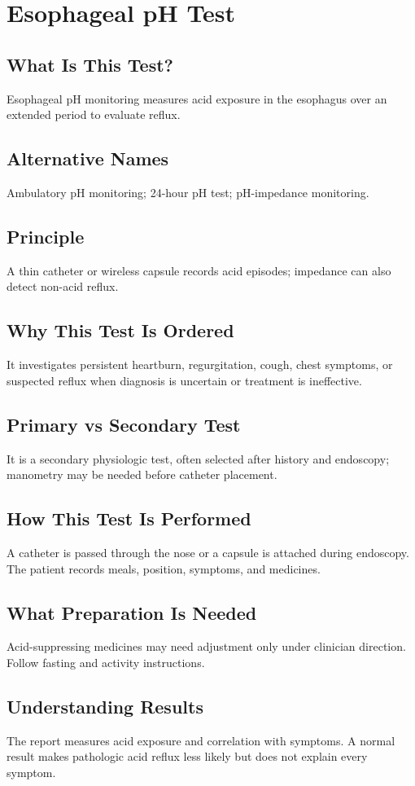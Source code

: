 \chapter{Esophageal pH Test}
\section*{What Is This Test?} Esophageal pH monitoring measures acid exposure in the esophagus over an extended period to evaluate reflux.
\section*{Alternative Names} Ambulatory pH monitoring; 24-hour pH test; pH-impedance monitoring.
\section*{Principle} A thin catheter or wireless capsule records acid episodes; impedance can also detect non-acid reflux.
\section*{Why This Test Is Ordered} It investigates persistent heartburn, regurgitation, cough, chest symptoms, or suspected reflux when diagnosis is uncertain or treatment is ineffective.
\section*{Primary vs Secondary Test} It is a secondary physiologic test, often selected after history and endoscopy; manometry may be needed before catheter placement.
\section*{How This Test Is Performed} A catheter is passed through the nose or a capsule is attached during endoscopy. The patient records meals, position, symptoms, and medicines.
\section*{What Preparation Is Needed} Acid-suppressing medicines may need adjustment only under clinician direction. Follow fasting and activity instructions.
\section*{Understanding Results} The report measures acid exposure and correlation with symptoms. A normal result makes pathologic acid reflux less likely but does not explain every symptom.
